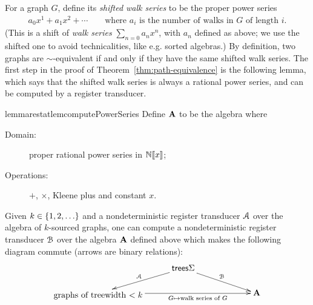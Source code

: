 For a graph $G$, define its \emph{shifted walk series} to be the proper power series 
\begin{align*}
  a_0 x^1 + a_1 x^2 + \cdots \qquad \text{where $a_i$ is the number of walks in $G$ of length $i$.}
\end{align*}
(This is a shift of \emph{walk series} $\sum_{n=0}a_nx^n$, with $a_n$ defined as above; we use the shifted one to avoid technicalities, like e.g. sorted algebras.)
By definition, two graphs are $\sim$-equivalent if and only if they have the same shifted walk series. 
The first step in the proof of Theorem~\ref{thm:path-equivalence} is the following lemma, which says that the shifted walk series is always a rational power series, and can be computed by a register transducer.
\begin{restatable}{lemmarestat}{lemcomputePowerSeries}\label{lem:compute-power-series}    
    Define  $\mathbf{A}$ to be the  algebra where
    \begin{description}
        \item[Domain:] proper rational power series in $\mathbb N [\![x]\!]$;
        \item[Operations:] $+$, $\times$, Kleene plus and constant $x$.
    \end{description}
    Given $k \in \{1,2,\ldots\}$ and a nondeterministic register transducer ${{\mathcal A}}$ over the algebra of $k$-sourced graphs, one can compute a  nondeterministic register transducer ${\mathcal B}$ over the algebra  $\mathbf{A}$ defined above which makes the following diagram commute (arrows are binary relations):
    \begin{align*}
    \xymatrix@C=1cm@R=0.5cm{
       &  \trees \Sigma   
        \ar[drr]^{\Bb}
        \ar[dl]_{\Aa} \\
        \txt{graphs of
        treewidth $< k$} \ar[rrr]_-{G \mapsto \text{walk series of $G$}}&& & \aalg
    }
    \end{align*}
\end{restatable}
